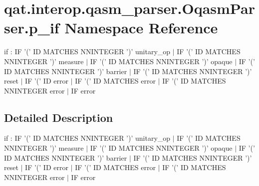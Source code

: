 \hypertarget{namespaceqat_1_1interop_1_1qasm__parser_1_1OqasmParser_1_1p__if}{\section{qat.\-interop.\-qasm\-\_\-parser.\-Oqasm\-Parser.\-p\-\_\-if Namespace Reference}
\label{namespaceqat_1_1interop_1_1qasm__parser_1_1OqasmParser_1_1p__if}
}


if \-: I\-F '(' I\-D M\-A\-T\-C\-H\-E\-S N\-N\-I\-N\-T\-E\-G\-E\-R ')' unitary\-\_\-op $|$ I\-F '(' I\-D M\-A\-T\-C\-H\-E\-S N\-N\-I\-N\-T\-E\-G\-E\-R ')' measure $|$ I\-F '(' I\-D M\-A\-T\-C\-H\-E\-S N\-N\-I\-N\-T\-E\-G\-E\-R ')' opaque $|$ I\-F '(' I\-D M\-A\-T\-C\-H\-E\-S N\-N\-I\-N\-T\-E\-G\-E\-R ')' barrier $|$ I\-F '(' I\-D M\-A\-T\-C\-H\-E\-S N\-N\-I\-N\-T\-E\-G\-E\-R ')' reset $|$ I\-F '(' I\-D error $|$ I\-F '(' I\-D M\-A\-T\-C\-H\-E\-S error $|$ I\-F '(' I\-D M\-A\-T\-C\-H\-E\-S N\-N\-I\-N\-T\-E\-G\-E\-R error $|$ I\-F error  




\subsection{Detailed Description}
if \-: I\-F '(' I\-D M\-A\-T\-C\-H\-E\-S N\-N\-I\-N\-T\-E\-G\-E\-R ')' unitary\-\_\-op $|$ I\-F '(' I\-D M\-A\-T\-C\-H\-E\-S N\-N\-I\-N\-T\-E\-G\-E\-R ')' measure $|$ I\-F '(' I\-D M\-A\-T\-C\-H\-E\-S N\-N\-I\-N\-T\-E\-G\-E\-R ')' opaque $|$ I\-F '(' I\-D M\-A\-T\-C\-H\-E\-S N\-N\-I\-N\-T\-E\-G\-E\-R ')' barrier $|$ I\-F '(' I\-D M\-A\-T\-C\-H\-E\-S N\-N\-I\-N\-T\-E\-G\-E\-R ')' reset $|$ I\-F '(' I\-D error $|$ I\-F '(' I\-D M\-A\-T\-C\-H\-E\-S error $|$ I\-F '(' I\-D M\-A\-T\-C\-H\-E\-S N\-N\-I\-N\-T\-E\-G\-E\-R error $|$ I\-F error 
